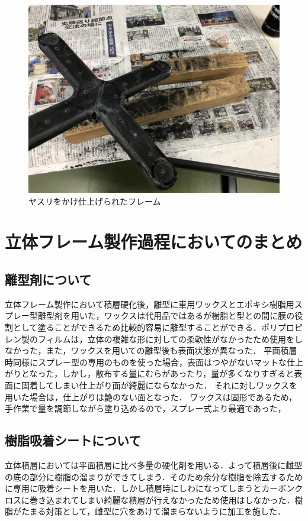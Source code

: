 \begin{figure}[htbp]
  \begin{center}
    \includegraphics[width=120mm]{img/１６.JPG}
    \end{center}
  \caption{ヤスリをかけ仕上げられたフレーム}
 \label{fig:robot}
\end{figure}

\section{立体フレーム製作過程においてのまとめ}
\subsection{離型剤について}
立体フレーム製作において積層硬化後，離型に車用ワックスとエポキシ樹脂用スプレー型離型剤を用いた，ワックスは代用品ではあるが樹脂と型との間に膜の役割として塗ることができるため比較的容易に離型することができる．ポリプロピレン製のフィルムは，立体の複雑な形に対しての柔軟性がなかったため使用をしなかった，また，ワックスを用いての離型後も表面状態が異なった．
平面積層時同様にスプレー型の専用のものを使った場合，表面はつやがないマットな仕上がりとなった，しかし，散布する量にむらがあったり，量が多くなりすぎると表面に固着してしまい仕上がり面が綺麗にならなかった．
それに対しワックスを用いた場合は，仕上がりは艶のない面となった．
ワックスは固形であるため，手作業で量を調節しながら塗り込めるので，スプレー式より最適であった，

\subsection{樹脂吸着シートについて}
立体積層においては平面積層に比べ多量の硬化剤を用いる．よって積層後に雌型の底の部分に樹脂の溜まりができてしまう．そのため余分な樹脂を除去するために専用に吸着シートを用いた．しかし積層時にしわになってしまうとカーボンクロスに巻き込まれてしまい綺麗な積層が行えなかったため使用はしなかった．樹脂がたまる対策として，雌型に穴をあけて溜まらないように加工を施した．

